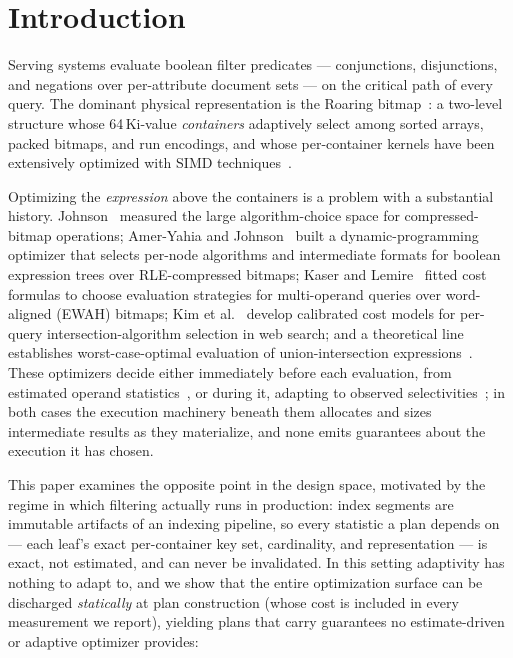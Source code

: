 \documentclass[sigconf,nonacm]{acmart}
\begin{document}
\maketitle

\section{Introduction}
\label{sec:intro}

Serving systems evaluate boolean filter predicates --- conjunctions,
disjunctions, and negations over per-attribute document sets --- on the
critical path of every query. The dominant physical representation is the
Roaring bitmap~\cite{chambi2016,lemire2018}: a two-level structure whose
64\,Ki-value \emph{containers} adaptively select among sorted arrays,
packed bitmaps, and run encodings, and whose per-container kernels have
been extensively optimized with SIMD
techniques~\cite{schlegel2011,inoue2014,lemire2016simd,han2018,fesia2020}.

Optimizing the \emph{expression} above the containers is a problem with a
substantial history. Johnson~\cite{johnson1999} measured the large
algorithm-choice space for compressed-bitmap operations; Amer-Yahia and
Johnson~\cite{ameryahia2000} built a dynamic-programming optimizer that
selects per-node algorithms and intermediate formats for boolean
expression trees over RLE-compressed bitmaps; Kaser and
Lemire~\cite{kaser2016} fitted cost formulas to choose evaluation
strategies for multi-operand queries over word-aligned (EWAH)
bitmaps; Kim et al.~\cite{kim2018} develop calibrated cost models for
per-query intersection-algorithm selection in web search; and a
theoretical line establishes worst-case-optimal evaluation of
union-intersection expressions~\cite{chiniforooshan2005,bille2007}.
These optimizers decide either immediately before each evaluation,
from estimated operand statistics~\cite{ameryahia2000,kaser2016,
kim2018}, or during it, adapting to observed
selectivities~\cite{raman2007}; in both cases the execution machinery
beneath them allocates and sizes intermediate results as they
materialize, and none emits guarantees about the execution it has
chosen.

This paper examines the opposite point in the design space, motivated by
the regime in which filtering actually runs in production: index
segments are immutable artifacts of an indexing pipeline, so every
statistic a plan depends on --- each leaf's exact per-container key
set, cardinality, and representation --- is exact, not estimated, and
can never be invalidated. In this setting adaptivity has nothing to
adapt to, and we show that the entire optimization surface can be
discharged \emph{statically} at plan construction (whose cost is
included in every measurement we report), yielding plans that carry
guarantees no estimate-driven or adaptive optimizer provides:
\end{document}
